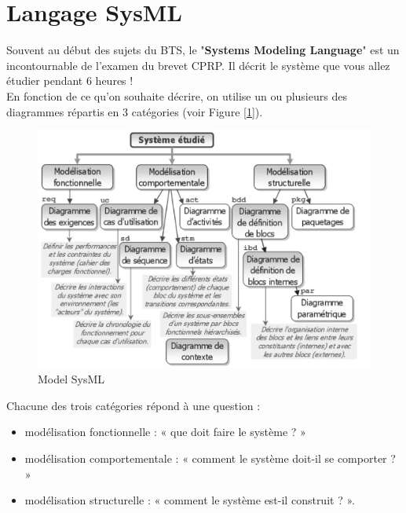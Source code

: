 \documentclass[
	11pt, %
	fleqn, %
	a4paper, %
]{LegrandOrangeBook}
\begin{document}
\section{Langage SysML}

Souvent au début des sujets du BTS, le "\textbf{Systems Modeling Language}" est un incontournable de l'examen du brevet CPRP. Il décrit le système que vous allez étudier pendant 6 heures !\\
En fonction de ce qu'on souhaite décrire, on utilise un ou plusieurs des diagrammes répartis en 3 catégories (voir Figure [\ref{Sys1}]).


\begin{figure}[ht] %
	\centering %
	\includegraphics[width=1\textwidth]{Images/Sys1.JPG} %
	\caption{Model SysML}
	\label{Sys1} %
\end{figure}



Chacune des trois catégories répond à une question :
\begin{itemize}
    \item modélisation fonctionnelle : « que doit faire le système ? »
    \item modélisation comportementale : « comment le système doit-il se comporter ? »
    \item modélisation structurelle : « comment le système est-il construit ? ».\\
\end{itemize}
\end{document}
